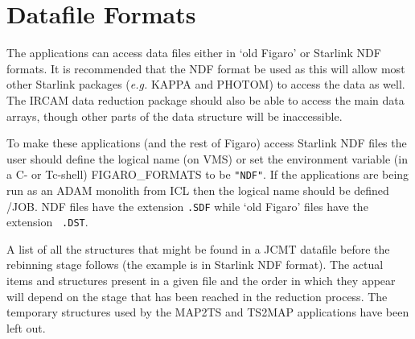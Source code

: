 \section{Datafile Formats
\label{sec-data}}

The applications can access data files either in `old Figaro' or
Starlink  NDF formats. It is recommended that the NDF format be used
as this will allow most other Starlink packages ({\em e.g.} KAPPA and
PHOTOM) to access the data as well. The IRCAM data reduction package
should also be able to access the main data arrays, though other parts
of the data structure will be inaccessible.

To make these applications (and the rest of Figaro) access Starlink
NDF files the user should define the logical name (on VMS) or set the
environment variable (in a C- or Tc-shell) FIGARO\_FORMATS to
be {\tt  "NDF"}. If the applications are being run as an ADAM monolith from
ICL then the logical name should be defined /JOB. NDF files have the
extension {\tt .SDF} while `old Figaro' files have the extension {\tt
.DST}.

A list of all the structures that might be found in a JCMT datafile
before the rebinning stage follows (the example is in Starlink NDF
format).  The actual items and  structures present in a given file and
the order in which they appear will depend on the stage that has been
reached in the reduction process. The temporary structures used by the
MAP2TS and TS2MAP applications  have been left out.

\goodbreak

